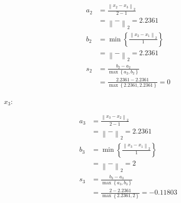 \documentclass[12pt]{article}
\begin{document}
\begin{enumerate}[leftmargin=\labelsep]
\begin{enumerate}[leftmargin=\labelsep]
\begin{paracol}{2}
                  \begin{equation*}
                    \begin{aligned}
                      a_2 & = \frac{\left\| x_2 - x_3 \right\|_2}{2 - 1}                             \\
                          & = \left\|  -  \right\|_2
                      = 2.2361                                                                       \\
                      b_2 & = \min\left\{\frac{\left\| x_2 - x_1 \right\|_2}{1}\right\}              \\
                          & = \left\|  -  \right\|_2
                      = 2.2361                                                                       \\
                      s_2 & = \frac{b_2 - a_2}{\max\left\{a_2, b_2\right\}}                          \\
                          & = \frac{2.2361 - 2.2361}{\max\left\{2.2361, 2.2361\right\}} = 0
                    \end{aligned}
                  \end{equation*}

                  \switchcolumn

                  $x_3$:

                  \begin{equation*}
                    \begin{aligned}
                      a_3 & = \frac{\left\| x_3 - x_2 \right\|_2}{2 - 1}                             \\
                          & = \left\|  -  \right\|_2
                      = 2.2361                                                                       \\
                      b_3 & = \min\left\{\frac{\left\| x_3 - x_1 \right\|_2}{1}\right\}              \\
                          & = \left\|  -  \right\|_2
                      = 2                                                                            \\
                      s_3 & = \frac{b_3 - a_3}{\max\left\{a_3, b_3\right\}}                          \\
                          & = \frac{2 - 2.2361}{\max\left\{2.2361, 2\right\}} = -0.11803
                    \end{aligned}
                  \end{equation*}


\end{paracol}
\end{enumerate}
\end{enumerate}
\end{document}
